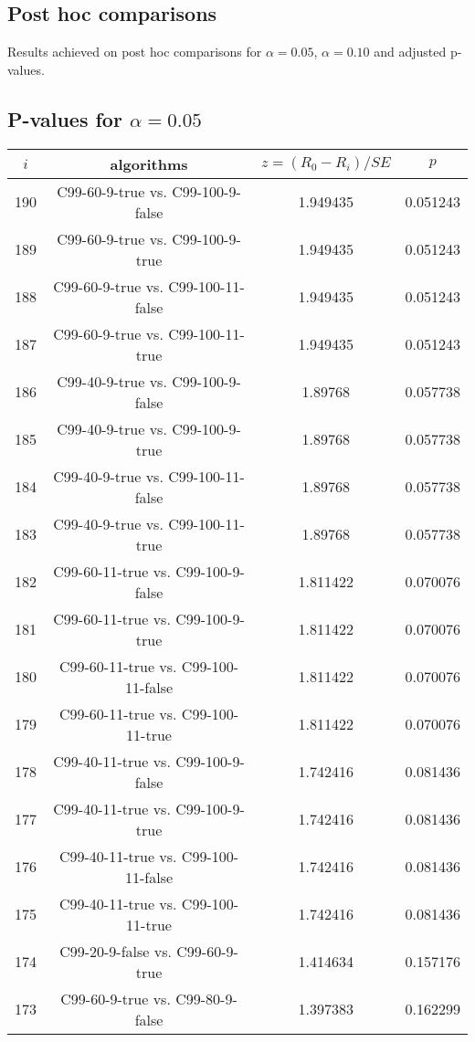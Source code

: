 \documentclass[a4paper,10pt]{article}
\begin{document}
\begin{landscape}
\pagebreak

\section{Post hoc comparisons}

Results achieved on post hoc comparisons for $\alpha = 0.05$, $\alpha = 0.10$ and adjusted p-values.

\subsection{P-values for $\alpha=0.05$}

\begin{table}[!htp]
\centering\scriptsize
\begin{tabular}{cccc}
$i$&algorithms&$z=(R_0 - R_i)/SE$&$p$\\
\hline190&C99-60-9-true vs. C99-100-9-false&1.949435&0.051243\\
189&C99-60-9-true vs. C99-100-9-true&1.949435&0.051243\\
188&C99-60-9-true vs. C99-100-11-false&1.949435&0.051243\\
187&C99-60-9-true vs. C99-100-11-true&1.949435&0.051243\\
186&C99-40-9-true vs. C99-100-9-false&1.89768&0.057738\\
185&C99-40-9-true vs. C99-100-9-true&1.89768&0.057738\\
184&C99-40-9-true vs. C99-100-11-false&1.89768&0.057738\\
183&C99-40-9-true vs. C99-100-11-true&1.89768&0.057738\\
182&C99-60-11-true vs. C99-100-9-false&1.811422&0.070076\\
181&C99-60-11-true vs. C99-100-9-true&1.811422&0.070076\\
180&C99-60-11-true vs. C99-100-11-false&1.811422&0.070076\\
179&C99-60-11-true vs. C99-100-11-true&1.811422&0.070076\\
178&C99-40-11-true vs. C99-100-9-false&1.742416&0.081436\\
177&C99-40-11-true vs. C99-100-9-true&1.742416&0.081436\\
176&C99-40-11-true vs. C99-100-11-false&1.742416&0.081436\\
175&C99-40-11-true vs. C99-100-11-true&1.742416&0.081436\\
174&C99-20-9-false vs. C99-60-9-true&1.414634&0.157176\\
173&C99-60-9-true vs. C99-80-9-false&1.397383&0.162299\\

\end{tabular}
\end{table}
\end{landscape}
\end{document}
